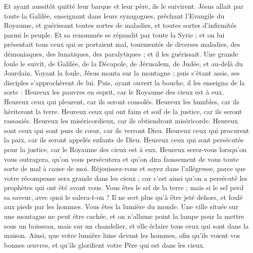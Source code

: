 \begin{multicols}{2}
Et ayant aussitôt quitté leur barque et leur père, ils le suivirent.
Jésus allait par toute la Galilée, enseignant dans leurs synagogues, prêchant l'Evangile du Royaume, et guérissant toutes sortes de maladies, et toutes sortes d’infirmités parmi le peuple.
Et sa renommée se répandit par toute la Syrie ; et on lui présentait tous ceux qui se portaient mal, tourmentés de diverses maladies, des démoniaques, des lunatiques, des paralytiques ; et il les guérissait.
Une grande foule le suivit, de Galilée, de la Décapole, de Jérusalem, de Judée, et au-delà du Jourdain.
\VerseOne{}Voyant la foule, Jésus monta sur la montagne ; puis s'étant assis, ses disciples s'approchèrent de lui.
Puis, ayant ouvert la bouche, il les enseigna de la sorte :
Heureux les pauvres en esprit, car le Royaume des cieux est à eux.
Heureux ceux qui pleurent, car ils seront consolés.
Heureux les humbles, car ils hériteront la terre.
Heureux ceux qui ont faim et soif de la justice, car ils seront rassasiés.
Heureux les miséricordieux, car ils obtiendront miséricorde.
Heureux sont ceux qui sont purs de cœur, car ils verront Dieu.
Heureux ceux qui procurent la paix, car ils seront appelés enfants de Dieu.
Heureux ceux qui sont persécutés pour la justice, car le Royaume des cieux est à eux.
Heureux serez-vous lorsqu’on vous outragera, qu’on vous persécutera et qu’on dira faussement de vous toute sorte de mal à cause de moi.
Réjouissez-vous et soyez dans l’allégresse, parce que votre récompense sera grande dans les cieux ; car c’est ainsi qu’on a persécuté les prophètes qui ont été avant vous.
Vous êtes le sel de la terre ; mais si le sel perd sa saveur, avec quoi le salera-t-on ? Il ne sert plus qu’à être jeté dehors, et foulé aux pieds par les hommes.
Vous êtes la lumière du monde. Une ville située sur une montagne ne peut être cachée,
et on n'allume point la lampe pour la mettre sous un boisseau, mais sur un chandelier, et elle éclaire tous ceux qui sont dans la maison.
Ainsi, que votre lumière luise devant les hommes, afin qu'ils voient vos bonnes œuvres, et qu'ils glorifient votre Père qui est dans les cieux.

\end{multicols}
